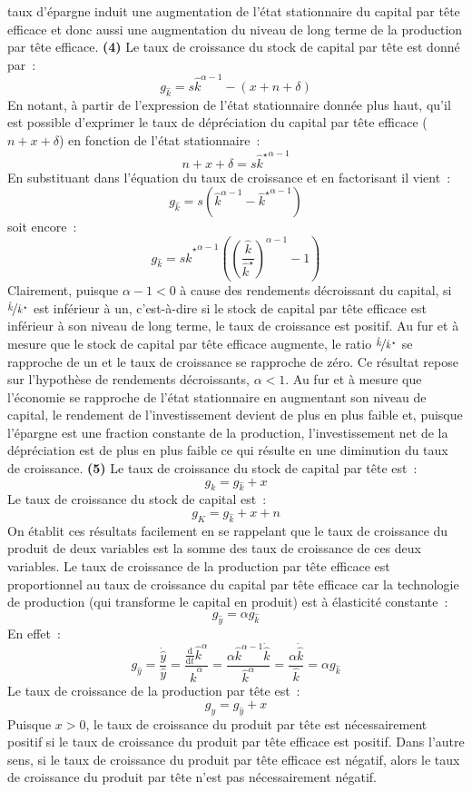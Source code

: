 \documentclass[10pt,a4paper,notitlepage]{report}
\newcommand{\question}[1]{\textbf{(#1)}}
\begin{document}
taux  d'épargne  induit une  augmentation  de  l'état stationnaire  du
capital par tête efficace et donc  aussi une augmentation du niveau de
long terme de la production par tête efficace. \question{4} Le taux de
croissance du stock de capital par tête est donné par :
\[
g_{\hat k} = s \hat k^{\alpha-1} - (x+n+\delta)
\]
En notant, à partir de l'expression de l'état stationnaire donnée plus
haut, qu'il est possible d'exprimer le taux de dépréciation du capital
par tête efficace ($n+x+\delta$) en fonction de l'état stationnaire :
\[
n+x+\delta = s \left.{\hat k}^\star\right.^{\alpha-1}
\]
En substituant dans l'équation du taux de croissance et en factorisant il vient :
\[
g_{\hat k} = s \left(\hat k^{\alpha-1} - \left.{\hat k}^\star\right.^{\alpha-1}\right)
\]
soit encore :
\[
g_{\hat k} = s \left.{\hat k}^\star\right.^{\alpha-1} \left(\left(\frac{\hat k}{\hat k^\star}\right)^{\alpha-1} - 1\right)
\]
Clairement, puisque $\alpha-1<0$ à cause des rendements décroissant du
capital, si  $\nicefrac{\hat k}{{\hat  k}^\star}$ est inférieur  à un,
c'est-à-dire si le stock de capital  par tête efficace est inférieur à
son niveau de long terme, le taux de croissance est positif. Au fur et
à mesure que le stock de  capital par tête efficace augmente, le ratio
$\nicefrac{\hat k}{{\hat k}^\star}$  se rapproche de un et  le taux de
croissance se rapproche de zéro. Ce résultat repose sur l'hypothèse de
rendements  décroissants,   $\alpha<1$.   Au  fur  et   à  mesure  que
l'économie  se  rapproche de  l'état  stationnaire  en augmentant  son
niveau de capital, le rendement de l'investissement devient de plus en
plus faible  et, puisque  l'épargne est une  fraction constante  de la
production, l'investissement  net de  la dépréciation  est de  plus en
plus   faible  ce   qui  résulte   en  une   diminution  du   taux  de
croissance. \question{5} Le taux de croissance du stock de capital par
tête est :
\[
g_k = g_{\hat k} + x
\]
Le taux de croissance du stock de capital est :
\[
g_K = g_{\hat k} + x + n
\]
On établit  ces résultats facilement  en se  rappelant que le  taux de
croissance  du produit  de deux  variables est  la somme  des taux  de
croissance de ces deux variables. Le taux de croissance de la production par tête efficace est proportionnel au taux de croissance du capital par tête efficace car la technologie de production (qui transforme le capital en produit) est à élasticité constante :
\[
g_{\hat y} = \alpha g_{\hat k}
\]
En effet :
\[
g_{\hat y} = \frac{\dot{\hat{y}}}{\hat y} = \frac{\frac{\mathrm d}{\mathrm dt}\hat k^\alpha}{\hat k^\alpha} =  \frac{\alpha \hat k^{\alpha-1}\dot{\hat{k}}}{\hat k^\alpha} = \frac{\alpha \dot{\hat{k}}}{\hat k} = \alpha g_{\hat k}   
\]
Le taux de croissance de la production par tête est :
\[
g_y = g_{\hat y} + x
\]
Puisque  $x>0$,  le  taux  de  croissance  du  produit  par  tête  est
nécessairement positif  si le taux  de croissance du produit  par tête
efficace est positif.  Dans l'autre sens, si le taux  de croissance du
produit par tête efficace est négatif,  alors le taux de croissance du
produit par tête n'est pas nécessairement négatif.
\end{document}
